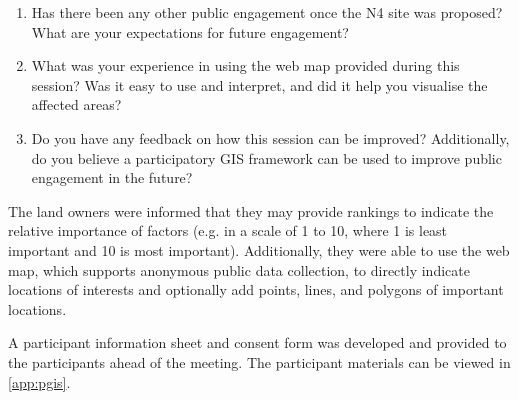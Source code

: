\begin{enumerate}[noitemsep]
  \item Has there been any other public engagement once the N4 site was proposed? What are your expectations for future engagement?
  \item What was your experience in using the web map provided during this session? Was it easy to use and interpret, and did it help you visualise the affected areas?
  \item Do you have any feedback on how this session can be improved? Additionally, do you believe a participatory GIS framework can be used to improve public engagement in the future?
\end{enumerate}

The land owners were informed that they may provide rankings to indicate the relative importance of factors (e.g. in a scale of 1 to 10, where 1 is least important and 10 is most important). Additionally, they were able to use the web map, which supports anonymous public data collection, to directly indicate locations of interests and optionally add points, lines, and polygons of important locations.

A participant information sheet and consent form was developed and provided to the participants ahead of the meeting. The participant materials can be viewed in \autoref{app:pgis}.
